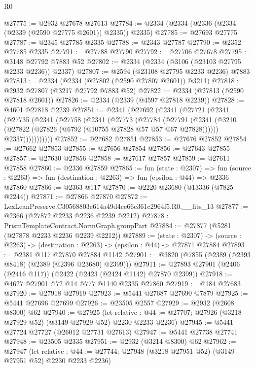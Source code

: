 \begin{lexlean}{R0}
\begin{coremodule}
@27775 := @2932 @27678 @27613
@27784 := @2334 (@2334 (@2336 (@2334 (@2339 (@2590 @27775 @2601)) @2335)) @2335)
@27785 := @27693 @27775
@27787 := @2345 @27785 @2335
@27788 := @2343 @27787
@27790 := @2352 @27785 @2335
@27791 := @27788 @27790
@27792 := @27706 @27678
@27795 := @3148 @27792 @7883 @52
@27802 := @2334 (@2334 (@3106 (@23103 @27795 @2233 @2236)) @2337)
@27807 := @2594 (@23108 @27795 @2233 @2236) @7883
@27813 := @2334 (@2334 (@27802 (@2590 @27807 @2601)) @3211)
@27818 := @2932 @27807 (@3217 @27792 @7883 @52)
@27822 := @2334 (@27813 (@2590 @27818 @2601))
@27826 := @2334 (@2339 (@4597 @27818 @2239))
@27828 := @4601 @27818 @2239
@27851 := @2341
    (@27692
      (@2341
        (@27721
          (@2341
            (@27735
              (@2341
                (@27758
                  (@2341
                    (@27773
                      (@27784
                        (@27791
                          (@2341
                            (@3210 (@27822 (@27826 (@6792 (@10755 @27828 @57 @57 @67 @27828))))))
                          @2337)))))))))))
@27852 := @27682 @27851
@27853 := @27676 @27852
@27854 := @27662 @27853
@27855 := @27656 @27854
@27856 := @27643 @27855
@27857 := @27630 @27856
@27858 := @27617 @27857
@27859 := @27611 @27858
@27860 := @2336 @27859
@27865 := fun (state : @2307) =>
  fun (source : @2263) => fun (destination : @2263) => fun (epsilon : @44) => @2336 @27860
@27866 := @2363 @117
@27870 := @2220 @23680 (@13336 (@7825 @2244))
@27871 := @27866 @27870
@27872 := LexLeanPreserve.C30568803e614a49d4ce66c361c2964f5.R0.__fits_13
@27877 := @2366 (@27872 @2233 @2236 @2239 @2212)
@27878 := PrismTemplateContract.NormGraph.groupPart
@27884 := @27877 (@5281 (@27878 @2233 @2236 @2239 @2212))
@27889 := (state : @2307) ->
  (source : @2263) -> (destination : @2263) -> (epsilon : @44) -> @27871 @27884
@27893 := @2381 @117 @27870 @27884 @1142
@27901 := @3820 (@7855 (@2389 (@2393 @8418) (@2389 (@2396 @23680) @2399)))
@27911 := @27893 @27901 (@2406 (@2416 @117)) (@2422 (@2423 (@2424 @1142) @27870 @2399))
@27918 := @4627 @27901 @72 @14 @777 @1140 @2335 @27860
@27919 := @184 @27683
@27920 := @27918 @27919
@27923 := @5441 @27687 @27690 @7879
@27925 := @5441 @27696 @27699
@27926 := @23505 @2557
@27929 := @2932 (@2608 @8300) @62
@27940 := @27925
    (let relative : @44 := @27707; @27926 (@3218 @27929 @52) (@3149 @27929 @52) @2230 @2233 @2236)
@27945 := @5441 @27724 @27727 (@26012 @27731 @27613)
@27947 := @5441 @27738 @27741
@27948 := @23505 @2335
@27951 := @2932 (@3214 @8300) @62
@27962 := @27947
    (let relative : @44 := @27744; @27948 (@3218 @27951 @52) (@3149 @27951 @52) @2230 @2233 @2236)

\end{coremodule}
\end{lexlean}
